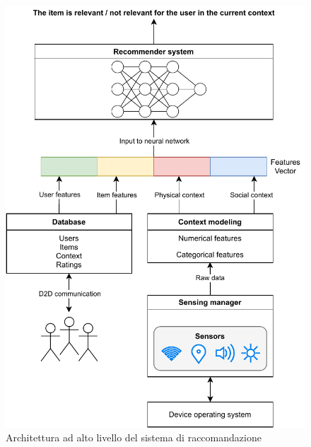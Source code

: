 \documentclass[12pt,italian]{report}
\begin{document}
\begin{figure}
  \centering
  \includegraphics[width=\linewidth]{immagini/full_RS.pdf}
  \caption{Architettura ad alto livello del sistema di raccomandazione}
  \label{fig:full_RS}
\end{figure}
\end{document}
